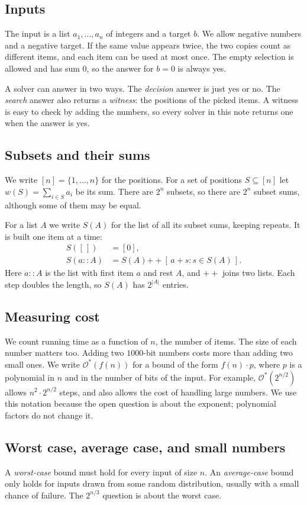 \documentclass[conference]{IEEEtran}
\newcommand{\Oh}{\mathcal{O}}
\begin{document}
\subsection{Inputs}
The input is a list $a_1,\dots,a_n$ of integers and a target $b$. We allow
negative numbers and a negative target. If the same value appears twice, the
two copies count as different items, and each item can be used at most once.
The empty selection is allowed and has sum $0$, so the answer for $b=0$ is
always yes.

A solver can answer in two ways. The \emph{decision} answer is just yes or no.
The \emph{search} answer also returns a \emph{witness}: the positions of the
picked items. A witness is easy to check by adding the numbers, so every solver
in this note returns one when the answer is yes.

\subsection{Subsets and their sums}
We write $[n]=\{1,\dots,n\}$ for the positions. For a set of positions
$S\subseteq[n]$ let $w(S)=\sum_{i\in S}a_i$ be its sum. There are $2^n$
subsets, so there are $2^n$ subset sums, although some of them may be equal.

For a list $A$ we write $S(A)$ for the list of all its subset sums, keeping
repeats. It is built one item at a time:
\begin{align}
S([\,])&=[0],\\
S(a::A)&=S(A)\mathbin{+\!+}[\,a+s : s\in S(A)\,].
\end{align}
Here $a::A$ is the list with first item $a$ and rest $A$, and $+\!+$ joins two
lists. Each step doubles the length, so $S(A)$ has $2^{|A|}$ entries.

\subsection{Measuring cost}
We count running time as a function of $n$, the number of items. The size of
each number matters too. Adding two $1000$-bit numbers costs more than adding
two small ones. We write $\Oh^*(f(n))$ for a bound of the form
$f(n)\cdot p$, where $p$ is a polynomial in $n$ and in the number of bits of
the input. For example, $\Oh^*(2^{n/2})$ allows $n^2\cdot2^{n/2}$ steps, and
also allows the cost of handling large numbers. We use this notation because
the open question is about the exponent; polynomial factors do not change it.

\subsection{Worst case, average case, and small numbers}
A \emph{worst-case} bound must hold for every input of size $n$. An
\emph{average-case} bound only holds for inputs drawn from some random
distribution, usually with a small chance of failure. The $2^{n/3}$ question is
about the worst case.
\end{document}
